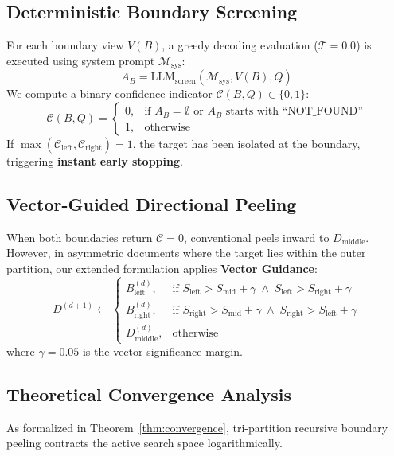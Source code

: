 \subsection{Deterministic Boundary Screening}
For each boundary view $V(B)$, a greedy decoding evaluation ($\mathcal{T} = 0.0$) is executed using system prompt $\mathcal{M}_{\text{sys}}$:
\begin{equation}
    A_B = \text{LLM}_{\text{screen}}\left( \mathcal{M}_{\text{sys}}, V(B), Q \right)
\end{equation}
We compute a binary confidence indicator $\mathcal{C}(B, Q) \in \{0, 1\}$:
\begin{equation}
    \mathcal{C}(B, Q) = \begin{cases}
        0, & \text{if } A_B = \emptyset \text{ or } A_B \text{ starts with } \text{``NOT\_FOUND''} \\
        1, & \text{otherwise}
    \end{cases}
\end{equation}
If $\max(\mathcal{C}_{\text{left}}, \mathcal{C}_{\text{right}}) = 1$, the target has been isolated at the boundary, triggering \textbf{instant early stopping}.

\subsection{Vector-Guided Directional Peeling}
When both boundaries return $\mathcal{C} = 0$, conventional \RBER{} peels inward to $D_{\text{middle}}$. However, in asymmetric documents where the target lies within the outer partition, our extended formulation applies \textbf{Vector Guidance}:
\begin{equation}
    D^{(d+1)} \leftarrow \begin{cases}
        B_{\text{left}}^{(d)}, & \text{if } S_{\text{left}} > S_{\text{mid}} + \gamma \;\land\; S_{\text{left}} > S_{\text{right}} + \gamma \\
        B_{\text{right}}^{(d)}, & \text{if } S_{\text{right}} > S_{\text{mid}} + \gamma \;\land\; S_{\text{right}} > S_{\text{left}} + \gamma \\
        D_{\text{middle}}^{(d)}, & \text{otherwise}
    \end{cases}
\end{equation}
where $\gamma = 0.05$ is the vector significance margin.

\subsection{Theoretical Convergence Analysis}
As formalized in Theorem~\ref{thm:convergence}, tri-partition recursive boundary peeling contracts the active search space logarithmically.

